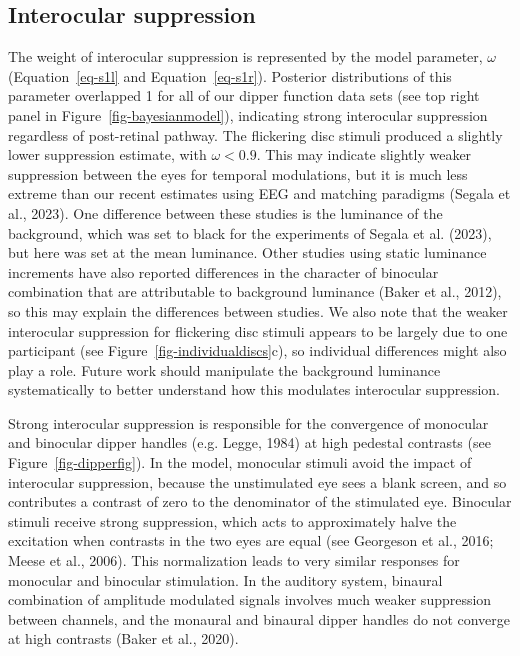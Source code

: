 \documentclass[
  letterpaper,
  DIV=11,
  numbers=noendperiod]{scrartcl}
\begin{document}
\subsection{Interocular suppression}\label{interocular-suppression}

The weight of interocular suppression is represented by the model
parameter, \(\omega\) (Equation~\ref{eq-s1l} and Equation~\ref{eq-s1r}).
Posterior distributions of this parameter overlapped 1 for all of our
dipper function data sets (see top right panel in
Figure~\ref{fig-bayesianmodel}), indicating strong interocular
suppression regardless of post-retinal pathway. The flickering disc
stimuli produced a slightly lower suppression estimate, with
\(\omega < 0.9\). This may indicate slightly weaker suppression between
the eyes for temporal modulations, but it is much less extreme than our
recent estimates using EEG and matching paradigms (Segala et al., 2023).
One difference between these studies is the luminance of the background,
which was set to black for the experiments of Segala et al. (2023), but
here was set at the mean luminance. Other studies using static luminance
increments have also reported differences in the character of binocular
combination that are attributable to background luminance (Baker et al.,
2012), so this may explain the differences between studies. We also note
that the weaker interocular suppression for flickering disc stimuli
appears to be largely due to one participant (see
Figure~\ref{fig-individualdiscs}c), so individual differences might also
play a role. Future work should manipulate the background luminance
systematically to better understand how this modulates interocular
suppression.

Strong interocular suppression is responsible for the convergence of
monocular and binocular dipper handles (e.g. Legge, 1984) at high
pedestal contrasts (see Figure~\ref{fig-dipperfig}). In the model,
monocular stimuli avoid the impact of interocular suppression, because
the unstimulated eye sees a blank screen, and so contributes a contrast
of zero to the denominator of the stimulated eye. Binocular stimuli
receive strong suppression, which acts to approximately halve the
excitation when contrasts in the two eyes are equal (see Georgeson et
al., 2016; Meese et al., 2006). This normalization leads to very similar
responses for monocular and binocular stimulation. In the auditory
system, binaural combination of amplitude modulated signals involves
much weaker suppression between channels, and the monaural and binaural
dipper handles do not converge at high contrasts (Baker et al., 2020).
\end{document}
